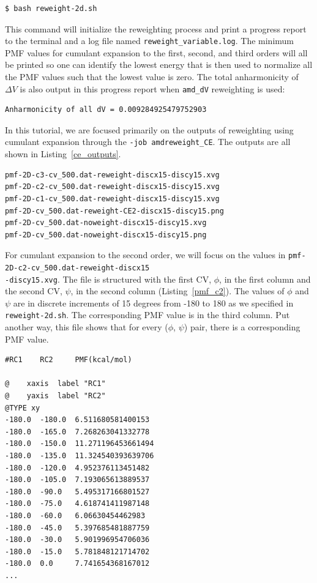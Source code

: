 \documentclass[9pt,tutorial,pubversion]{livecoms}
\begin{document}
\begin{lstlisting}[style=MyBash]
$ bash reweight-2d.sh
\end{lstlisting}

This command will initialize the reweighting process and print a progress report to the terminal and a log file named \texttt{reweight\_variable.log}. The minimum PMF values for cumulant expansion to the first, second, and third orders will all be printed so one can identify the lowest energy that is then used to normalize all the PMF values such that the lowest value is zero. The total anharmonicity of $\Delta{V}$ is also output in this progress report when \texttt{amd\_dV} reweighting is used:

\begin{lstlisting}[label=anharm, basicstyle=\small, backgroundcolor=\color{light-gray}]
Anharmonicity of all dV = 0.009284925479752903
\end{lstlisting}

In this tutorial, we are focused primarily on the outputs of reweighting using cumulant expansion through the \texttt{-job amdreweight\_CE}. The outputs are all shown in Listing~\ref{ce_outputs}.

\bigskip
\begin{lstlisting}[label=ce_outputs, caption=Reweighting Outputs, basicstyle=\small, backgroundcolor=\color{light-gray}]
pmf-2D-c3-cv_500.dat-reweight-discx15-discy15.xvg
pmf-2D-c2-cv_500.dat-reweight-discx15-discy15.xvg
pmf-2D-c1-cv_500.dat-reweight-discx15-discy15.xvg
pmf-2D-cv_500.dat-reweight-CE2-discx15-discy15.png
pmf-2D-cv_500.dat-noweight-discx15-discy15.xvg
pmf-2D-cv_500.dat-noweight-discx15-discy15.png
\end{lstlisting}

For cumulant expansion to the second order, we will focus on the values in \texttt{pmf-2D-c2-cv\_500.dat-reweight-discx15\\-discy15.xvg}. The file is structured with the first CV, $\phi$, in the first column and the second CV, $\psi$, in the second column (Listing~\ref{pmf_c2}). The values of $\phi$ and $\psi$ are in discrete increments of 15 degrees from -180 to 180 as we specified in \texttt{reweight-2d.sh}. The corresponding PMF value is in the third column. Put another way, this file shows that for every ($\phi$, $\psi$) pair, there is a corresponding PMF value.

\bigskip
\begin{lstlisting}[label=pmf_c2, caption=pmf-2D-c2-cv\_500.dat-reweight-discx15-discy15.xvg, basicstyle=\small, backgroundcolor=\color{light-gray}]
#RC1    RC2     PMF(kcal/mol)

@    xaxis  label "RC1"
@    yaxis  label "RC2"
@TYPE xy
-180.0  -180.0  6.511680581400153
-180.0  -165.0  7.268263041332778
-180.0  -150.0  11.271196453661494
-180.0  -135.0  11.324540393639706
-180.0  -120.0  4.952376113451482
-180.0  -105.0  7.193065613889537
-180.0  -90.0   5.495317166801527
-180.0  -75.0   4.618741411987148
-180.0  -60.0   6.06630454462983
-180.0  -45.0   5.397685481887759
-180.0  -30.0   5.901996954706036
-180.0  -15.0   5.781848121714702
-180.0  0.0     7.741654368167012
...
\end{lstlisting}
\end{document}

